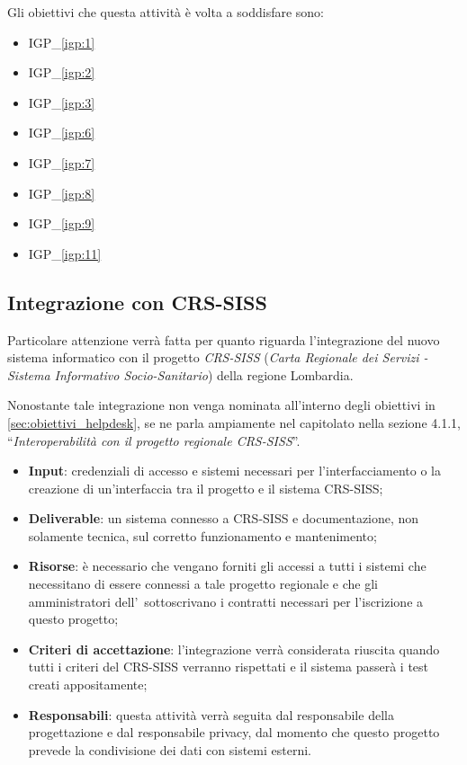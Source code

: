 		Gli obiettivi che questa attività è volta a soddisfare sono:
		\begin{itemize}[noitemsep]
			\renewcommand\labelitemi{--}
			\item {\color{pantone}IGP\_\ref{igp:1}}
			\item {\color{pantone}IGP\_\ref{igp:2}}
			\item {\color{pantone}IGP\_\ref{igp:3}}
			\item {\color{pantone}IGP\_\ref{igp:6}}
			\item {\color{pantone}IGP\_\ref{igp:7}}
			\item {\color{pantone}IGP\_\ref{igp:8}}
			\item {\color{pantone}IGP\_\ref{igp:9}}
			\item {\color{pantone}IGP\_\ref{igp:11}}
		\end{itemize}	

	\subsection{Integrazione con CRS-SISS}
	
		Particolare attenzione verrà fatta per quanto riguarda l'integrazione del nuovo sistema informatico con il progetto \textit{CRS-SISS} (\textit{Carta Regionale dei Servizi - Sistema Informativo Socio-Sanitario}) della regione Lombardia.
	
		Nonostante tale integrazione non venga nominata all'interno degli obiettivi in \ref{sec:obiettivi_helpdesk}, se ne parla ampiamente nel capitolato nella sezione 4.1.1, ``\textit{Interoperabilità con il progetto regionale CRS-SISS}''.
	
		\begin{itemize}[noitemsep]
			\renewcommand\labelitemi{--}
			\item \textbf{Input}: credenziali di accesso e sistemi necessari per l'interfacciamento o la creazione di un'interfaccia tra il progetto e il sistema CRS-SISS;
			\item \textbf{Deliverable}: un sistema connesso a CRS-SISS e documentazione, non solamente tecnica, sul corretto funzionamento e mantenimento;
			\item \textbf{Risorse}: è necessario che vengano forniti gli accessi a tutti i sistemi che necessitano di essere connessi a tale progetto regionale e che gli amministratori dell'\istituto~sottoscrivano i contratti necessari per l'iscrizione a questo progetto;
			\item \textbf{Criteri di accettazione}: l'integrazione verrà considerata riuscita quando tutti i criteri del CRS-SISS verranno rispettati e il sistema passerà i test creati appositamente;
			\item \textbf{Responsabili}: questa attività verrà seguita dal responsabile della progettazione e dal responsabile privacy, dal momento che questo progetto prevede la condivisione dei dati con sistemi esterni.
		\end{itemize}
	
